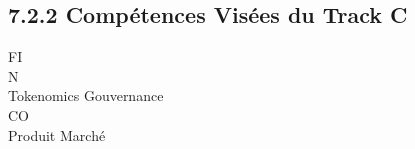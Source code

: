\documentclass[12pt,landscape,a4paper]{article}
\begin{document}
\subsection{7.2.2 Compétences Visées du Track C}
\vspace{0.5em}
\vspace{0.5em}
\vspace{0.5em}
\vspace{0.5em}
FI\\
N\\
Tokenomics              Gouvernance\\
CO\\
\vspace{0.5em}
Produit                  Marché\\
\vspace{0.5em}
\vspace{0.5em}
\vspace{0.5em}
\vspace{0.5em}
\end{document}
